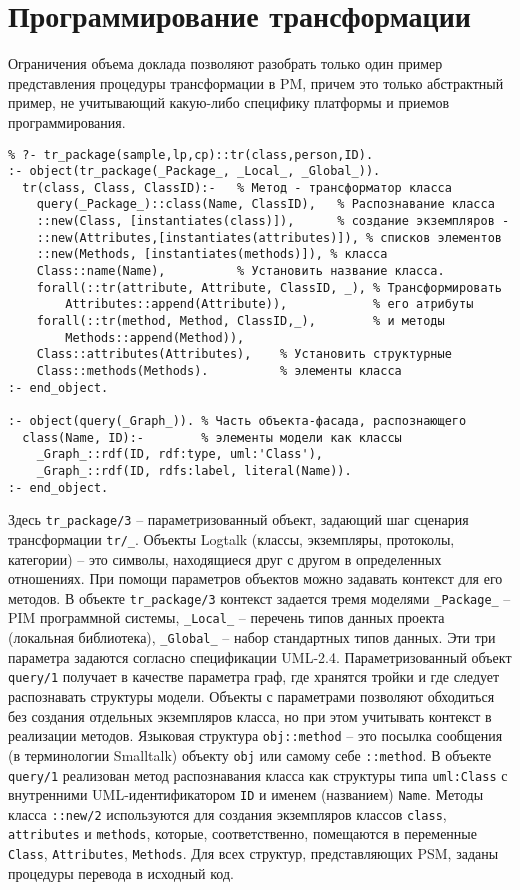 \documentclass[12pt]{article}
\begin{document}
\section{Программирование трансформации}

Ограничения объема доклада позволяют разобрать только один пример представления процедуры трансформации в PM, причем это только абстрактный пример, не учитывающий какую-либо специфику платформы и приемов программирования.
\begin{verbatim}
% ?- tr_package(sample,lp,cp)::tr(class,person,ID).
:- object(tr_package(_Package_, _Local_, _Global_)).
  tr(class, Class, ClassID):-   % Метод - трансформатор класса
    query(_Package_)::class(Name, ClassID),   % Распознавание класса
    ::new(Class, [instantiates(class)]),      % создание экземпляров -
    ::new(Attributes,[instantiates(attributes)]), % списков элементов
    ::new(Methods, [instantiates(methods)]), % класса
    Class::name(Name),          % Установить название класса.
    forall(::tr(attribute, Attribute, ClassID, _), % Трансформировать
        Attributes::append(Attribute)),            % его атрибуты
    forall(::tr(method, Method, ClassID,_),        % и методы
        Methods::append(Method)),
    Class::attributes(Attributes),    % Установить структурные
    Class::methods(Methods).          % элементы класса
:- end_object.

:- object(query(_Graph_)). % Часть объекта-фасада, распознающего
  class(Name, ID):-        % элементы модели как классы
    _Graph_::rdf(ID, rdf:type, uml:'Class'),
    _Graph_::rdf(ID, rdfs:label, literal(Name)).
:- end_object.
\end{verbatim}

Здесь \texttt{tr\_package/3} -- параметризованный объект, задающий шаг сценария трансформации \texttt{tr/\_}.  Объекты Logtalk (классы, экземпляры, протоколы, категории) -- это символы, находящиеся друг с другом в определенных отношениях.  При помощи параметров объектов можно задавать контекст для его методов.  В объекте \texttt{tr\_package/3} контекст задается тремя моделями \texttt{\_Package\_} -- PIM программной системы, \texttt{\_Local\_} -- перечень типов данных проекта (локальная библиотека), \texttt{\_Global\_} -- набор стандартных типов данных.  Эти три параметра задаются согласно спецификации UML-2.4.  Параметризованный объект \texttt{query/1} получает в качестве параметра граф, где хранятся тройки и где следует распознавать структуры модели.  Объекты с параметрами позволяют обходиться без создания отдельных экземпляров класса, но при этом учитывать контекст в реализации методов.  Языковая структура \texttt{obj::method} -- это посылка сообщения (в терминологии Smalltalk) объекту \texttt{obj} или самому себе \texttt{::method}.  В объекте \texttt{query/1} реализован метод распознавания класса как структуры типа \texttt{uml:Class} с внутренними UML-идентификатором \texttt{ID} и именем (названием) \texttt{Name}.  Методы класса \texttt{::new/2} используются для создания экземпляров классов \texttt{class}, \texttt{attributes} и \texttt{methods}, которые, соответственно, помещаются в переменные \texttt{Class}, \texttt{Attributes}, \texttt{Methods}.  Для всех структур, представляющих PSM, заданы процедуры перевода в исходный код.
\end{document}
